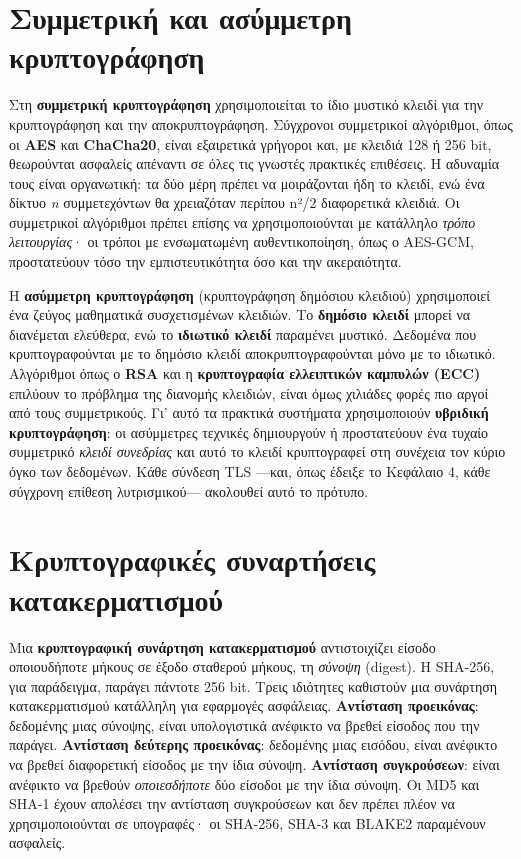 \section{Συμμετρική και ασύμμετρη κρυπτογράφηση}\label{sec:7.1}
Στη \textbf{συμμετρική κρυπτογράφηση} χρησιμοποιείται το ίδιο μυστικό κλειδί για την κρυπτογράφηση και την αποκρυπτογράφηση. Σύγχρονοι συμμετρικοί αλγόριθμοι, όπως οι \textbf{AES} και \textbf{ChaCha20}, είναι εξαιρετικά γρήγοροι και, με κλειδιά 128 ή 256 bit, θεωρούνται ασφαλείς απέναντι σε όλες τις γνωστές πρακτικές επιθέσεις. Η αδυναμία τους είναι οργανωτική: τα δύο μέρη πρέπει να μοιράζονται ήδη το κλειδί, ενώ ένα δίκτυο \emph{n} συμμετεχόντων θα χρειαζόταν περίπου n²/2 διαφορετικά κλειδιά. Οι συμμετρικοί αλγόριθμοι πρέπει επίσης να χρησιμοποιούνται με κατάλληλο \emph{τρόπο λειτουργίας}· οι τρόποι με ενσωματωμένη αυθεντικοποίηση, όπως ο AES-GCM, προστατεύουν τόσο την εμπιστευτικότητα όσο και την ακεραιότητα.

Η \textbf{ασύμμετρη κρυπτογράφηση} (κρυπτογράφηση δημόσιου κλειδιού) χρησιμοποιεί ένα ζεύγος μαθηματικά συσχετισμένων κλειδιών. Το \textbf{δημόσιο κλειδί} μπορεί να διανέμεται ελεύθερα, ενώ το \textbf{ιδιωτικό κλειδί} παραμένει μυστικό. Δεδομένα που κρυπτογραφούνται με το δημόσιο κλειδί αποκρυπτογραφούνται μόνο με το ιδιωτικό. Αλγόριθμοι όπως ο \textbf{RSA} και η \textbf{κρυπτογραφία ελλειπτικών καμπυλών (ECC)} επιλύουν το πρόβλημα της διανομής κλειδιών, είναι όμως χιλιάδες φορές πιο αργοί από τους συμμετρικούς. Γι' αυτό τα πρακτικά συστήματα χρησιμοποιούν \textbf{υβριδική κρυπτογράφηση}: οι ασύμμετρες τεχνικές δημιουργούν ή προστατεύουν ένα τυχαίο συμμετρικό \emph{κλειδί συνεδρίας} και αυτό το κλειδί κρυπτογραφεί στη συνέχεια τον κύριο όγκο των δεδομένων. Κάθε σύνδεση TLS —και, όπως έδειξε το Κεφάλαιο 4, κάθε σύγχρονη επίθεση λυτρισμικού— ακολουθεί αυτό το πρότυπο.

\section{Κρυπτογραφικές συναρτήσεις κατακερματισμού}\label{sec:7.2}
Μια \textbf{κρυπτογραφική συνάρτηση κατακερματισμού} αντιστοιχίζει είσοδο οποιουδήποτε μήκους σε έξοδο σταθερού μήκους, τη \emph{σύνοψη} (digest). Η SHA-256, για παράδειγμα, παράγει πάντοτε 256 bit. Τρεις ιδιότητες καθιστούν μια συνάρτηση κατακερματισμού κατάλληλη για εφαρμογές ασφάλειας. \textbf{Αντίσταση προεικόνας}: δεδομένης μιας σύνοψης, είναι υπολογιστικά ανέφικτο να βρεθεί είσοδος που την παράγει. \textbf{Αντίσταση δεύτερης προεικόνας}: δεδομένης μιας εισόδου, είναι ανέφικτο να βρεθεί διαφορετική είσοδος με την ίδια σύνοψη. \textbf{Αντίσταση συγκρούσεων}: είναι ανέφικτο να βρεθούν \emph{οποιεσδήποτε} δύο είσοδοι με την ίδια σύνοψη. Οι MD5 και SHA-1 έχουν απολέσει την αντίσταση συγκρούσεων και δεν πρέπει πλέον να χρησιμοποιούνται σε υπογραφές· οι SHA-256, SHA-3 και BLAKE2 παραμένουν ασφαλείς.


